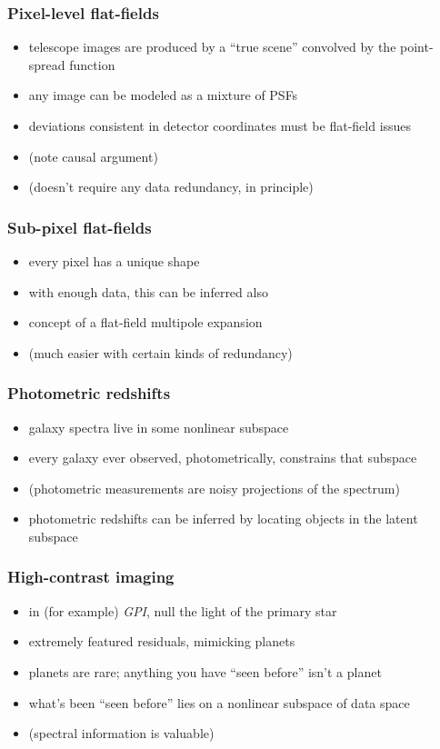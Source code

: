 \documentclass[pdftex]{beamer}
\begin{document}
\begin{frame}
  \frametitle{Pixel-level flat-fields}
  \begin{itemize}
  \item telescope images are produced by a ``true scene'' convolved by the point-spread function
  \item any image can be modeled as a mixture of PSFs
  \item deviations consistent in detector coordinates must be flat-field issues
  \item (note causal argument)
  \item (doesn't require any data redundancy, in principle)
  \end{itemize}
\end{frame}

\begin{frame}
  \frametitle{Sub-pixel flat-fields}
  \begin{itemize}
  \item every pixel has a unique shape
  \item with enough data, this can be inferred also
  \item concept of a flat-field multipole expansion
  \item (much easier with certain kinds of redundancy)
  \end{itemize}
\end{frame}

\begin{frame}
  \frametitle{Photometric redshifts}
  \begin{itemize}
  \item galaxy spectra live in some nonlinear subspace
  \item every galaxy ever observed, photometrically, constrains that subspace
  \item (photometric measurements are noisy projections of the spectrum)
  \item photometric redshifts can be inferred by locating objects in the latent subspace
  \end{itemize}
\end{frame}

\begin{frame}
  \frametitle{High-contrast imaging}
  \begin{itemize}
  \item in (for example) \textsl{GPI}, null the light of the primary star
  \item extremely featured residuals, mimicking planets
  \item planets are rare; anything you have ``seen before'' isn't a planet
  \item what's been ``seen before'' lies on a nonlinear subspace of data space
  \item (spectral information is valuable)
  \end{itemize}
\end{frame}
\end{document}
